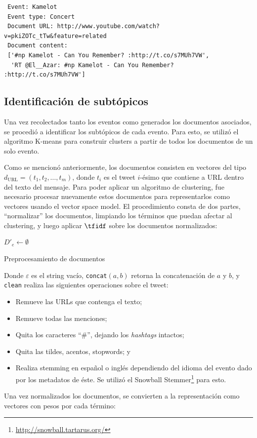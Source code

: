 \documentclass[upright, contnum]{umemoria}
\begin{document}
\begin{verbatim}
 Event: Kamelot
 Event type: Concert
 Document URL: http://www.youtube.com/watch?v=pkiZOTc_tTw&feature=related
 Document content: 
 ['#np Kamelot - Can You Remember? :http://t.co/s7MUh7VW', 
  'RT @El__Azar: #np Kamelot - Can You Remember? :http://t.co/s7MUh7VW']
\end{verbatim}


\subsection{Identificación de subtópicos}
\label{sec-4.2.2}


    Una vez recolectados tanto los eventos como generados los
    documentos asociados, se procedió a identificar los subtópicos de
    cada evento. Para esto, se utilizó el algoritmo K-means para
    construir clusters a partir de todos los documentos de un solo
    evento.

    Como se mencionó anteriormente, los documentos consisten en
    vectores del tipo $d_{\textrm{URL}}=(t_1,t_2,\ldots,t_m)$, donde
    $t_i$ es el tweet $i$-ésimo que contiene a URL dentro del texto
    del mensaje. Para poder aplicar un algoritmo de clustering, fue
    necesario procesar nuevamente estos documentos para representarlos
    como vectores usando el vector space model. El procedimiento
    consta de dos partes, ``normalizar'' los documentos, limpiando los
    términos que puedan afectar al clustering, y luego aplicar
    $\tfidf$ sobre los documentos normalizados:

\begin{algorithm}[H]
 $D'_e \leftarrow \emptyset$\; 
 \caption{Preprocesamiento de documentos}
\end{algorithm}
    
    Donde $\varepsilon$ es el string vacío, \texttt{concat}$(a,b)$ retorna
    la concatenación de $a$ y $b$, y \texttt{clean} realiza las siguientes
    operaciones sobre el tweet:

\begin{itemize}
\item Remueve las URLs que contenga el texto;
\item Remueve todas las menciones;
\item Quita los caracteres ``\#'', dejando los \emph{hashtags} intactos;
\item Quita las tildes, acentos, stopwords; y
\item Realiza stemming en español o inglés dependiendo del idioma del
      evento dado por los metadatos de éste. Se utilizó el Snowball
      Stemmer\footnote{\href{http://snowball.tartarus.org/}{http://snowball.tartarus.org/} } para esto.
\end{itemize}
    Una vez normalizados los documentos, se convierten a la
    representación como vectores con pesos por cada término:
\end{document}
